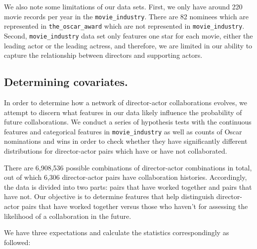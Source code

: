 \documentclass{article}
\begin{document}
We also note some limitations of our data sets. First, we only have around 220 movie records per year in the \texttt{movie\_industry}. There are 82 nominees which are represented in \texttt{the\_oscar\_award} which are not represented in \texttt{movie\_industry}. Second, \texttt{movie\_industry} data set only features one star for each movie, either the leading actor or the leading actress, and therefore, we are limited in our ability to capture the relationship between directors and supporting actors.

\subsection{Determining covariates.}

In order to determine how a network of director-actor collaborations evolves, we attempt to discern what features in our data likely influence the probability of future collaborations. We conduct a series of hypothesis tests with the continuous features and categorical features in \texttt{movie\_industry} as well as counts of Oscar nominations and wins in order to check whether they have significantly different distributions for director-actor pairs which have or have not collaborated.  

There are 6,908,536 possible combinations of director-actor combinations in total, out of which 6,306 director-actor pairs have collaboration histories. Accordingly, the data is divided into two parts: pairs that have worked together and pairs that have not. Our objective is to determine features that help distinguish director-actor pairs that have worked together versus those who haven't for assessing the likelihood of a collaboration in the future.


 We have three expectations and calculate the statistics correspondingly as followed:
\end{document}
